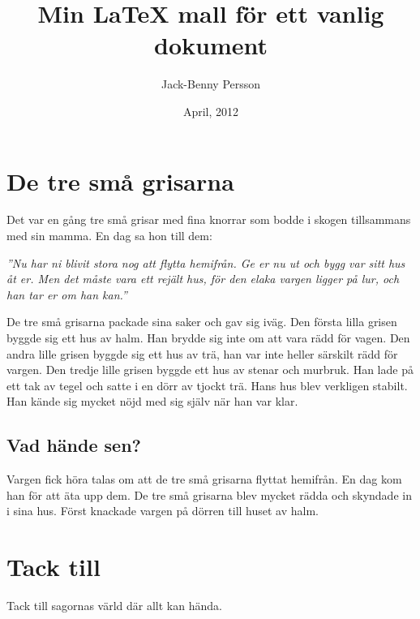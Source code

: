 \documentclass[11pt,a4paper,swedish]{article}
\title{Min \LaTeX{} mall för ett vanlig dokument}
\author{Jack-Benny Persson}
\date{April, 2012}
\begin{document}
\maketitle
\pagebreak

\tableofcontents

\pagebreak

\section{De tre små grisarna}

Det var en gång tre små grisar med fina knorrar som bodde i skogen tillsammans med sin mamma. En dag sa hon till dem:

\textit{''Nu har ni blivit stora nog att flytta hemifrån. Ge er nu ut och bygg var sitt hus åt er. Men det måste vara ett rejält hus, för den elaka vargen ligger på lur, och han tar er om han kan.''}

De tre små grisarna packade sina saker och gav sig iväg.
Den första lilla grisen byggde sig ett hus av halm. Han brydde sig inte om att vara rädd för vagen. Den andra lille grisen byggde sig ett hus av trä, han var inte heller särskilt rädd för vargen. Den tredje lille grisen byggde ett hus av stenar och murbruk. Han lade på ett tak av tegel och satte i en dörr av tjockt trä. Hans hus blev verkligen stabilt. Han kände sig mycket nöjd med sig själv när han var klar.

\subsection{Vad hände sen?}

Vargen fick höra talas om att de tre små grisarna flyttat hemifrån. En dag kom han för att äta upp dem. De tre små grisarna blev mycket rädda och skyndade in i sina hus.
Först knackade vargen på dörren till huset av halm.

\section{Tack till}

Tack till sagornas värld där allt kan hända.
\end{document}
